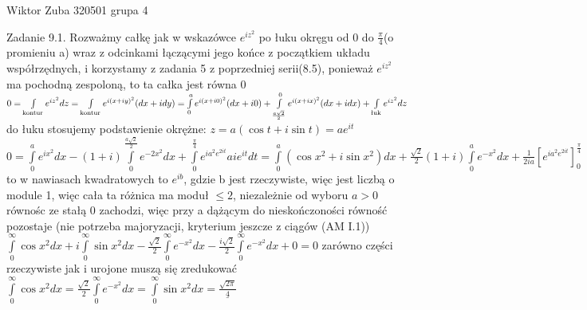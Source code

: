 \documentclass{article}
\begin{document}
Wiktor Zuba 320501 grupa 4
\newline

Zadanie 9.1.
\newline
\newline
Rozważmy całkę jak w wskazówce $e^{iz^2}$ po łuku okręgu od 0 do $\frac{\pi}{4}$(o promieniu a) wraz z odcinkami łączącymi jego końce z początkiem układu współrzędnych,
i korzystamy z zadania 5 z poprzedniej serii(8.5), ponieważ $e^{iz^2}$ ma pochodną zespoloną, to ta całka jest równa 0\newline
$
0=\int\limits_{\text{kontur}}e^{iz^2}dz=\int\limits_{\text{kontur}}e^{i(x+iy)^2}(dx+idy)=
\int\limits_{0}^{a}e^{i(x+i0)^2}(dx+i0)+\int\limits_{\frac{a\sqrt{2}}{2}}^{0}e^{i(x+ix)^2}(dx+idx)+\int\limits_{\text{łuk}}e^{iz^2}dz\newline
$do łuku stosujemy podstawienie okrężne: $z=a(\cos{t}+i\sin{t})=ae^{it}$\newline
$
0=\int\limits_{0}^{a}e^{ix^2}dx-(1+i)\int\limits_{0}^{\frac{a\sqrt{2}}{2}}e^{-2x^2}dx+\int\limits_{0}^{\frac{\pi}{4}}e^{ia^2e^{2it}}aie^{it}dt=
\int\limits_{0}^{a}(\cos{x^2}+i\sin{x^2})dx+\frac{\sqrt{2}}{2}(1+i)\int\limits_{0}^{a}e^{-x^2}dx+\frac{1}{2ia}\left[e^{ia^2e^{2it}}\right]_{0}^{\frac{\pi}{4}}$
to w nawiasach kwadratowych to $e^{ib}$, gdzie b jest rzeczywiste, więc jest liczbą o module 1, więc cała ta różnica ma moduł $\le2$, niezależnie od wyboru $a>0$
równośc ze stałą 0 zachodzi, więc przy a dążącym do nieskończoności równość pozostaje (nie potrzeba majoryzacji, kryterium jeszcze z ciągów (AM I.1))\newline
$
\int\limits_{0}^{\infty}\cos{x^2}dx+i\int\limits_{0}^{\infty}\sin{x^2}dx
-\frac{\sqrt{2}}{2}\int\limits_{0}^{\infty}e^{-x^2}dx-\frac{i\sqrt{2}}{2}\int\limits_{0}^{\infty}e^{-x^2}dx+0=0
$ zarówno części rzeczywiste jak i urojone muszą się zredukować
$
\int\limits_{0}^{\infty}\cos{x^2}dx=\frac{\sqrt{2}}{2}\int\limits_{0}^{\infty}e^{-x^2}dx=\int\limits_{0}^{\infty}\sin{x^2}dx=\underline{\frac{\sqrt{2\pi}}{4}}
$
\newline
\newline
\end{document}
